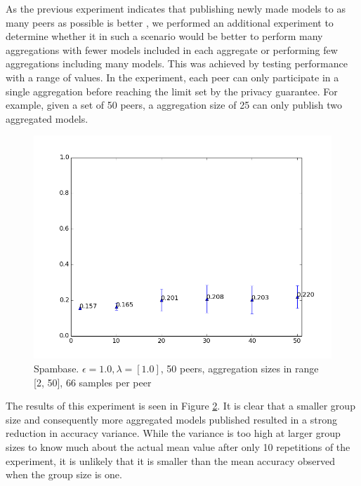 \begin{figure}[h!]
\begin{minipage}{.49\linewidth}
		\label{fig:RegRangeTestPubAll}
	\end{minipage}
\end{figure}

As the previous experiment indicates that publishing newly made models to as many peers as possible is better , we performed an additional experiment to determine whether it in such a scenario would be better to perform many aggregations with fewer models included in each aggregate or performing few aggregations including many models. This was achieved by testing performance with a range of values. In the experiment, each peer can only participate in a single aggregation before reaching the limit set by the privacy guarantee. For example, given a set of 50 peers, a aggregation size of 25 can only publish two aggregated models.
 
\begin{figure}[h!]
	\centering
	\includegraphics[width=\textwidth]{fig/GroupSizeEffectSpam-eps1.0,budg=eps,peers50,groups2-50,reg2e0-pubAll-LRbyCV-retuning}
	\caption{Spambase. $\epsilon = 1.0, \lambda = [1.0]$, 50 peers, aggregation sizes in range [2, 50], 66 samples per peer}
	\label{fig:groupsize_is_better}
\end{figure}

The results of this experiment is seen in Figure \ref{fig:groupsize_is_better}. It is clear that a smaller group size and consequently more aggregated models published resulted in a strong reduction in accuracy variance. While the variance is too high at larger group sizes to know much about the actual mean value after only 10 repetitions of the experiment, it is unlikely that it is smaller than the mean accuracy observed when the group size is one. 

